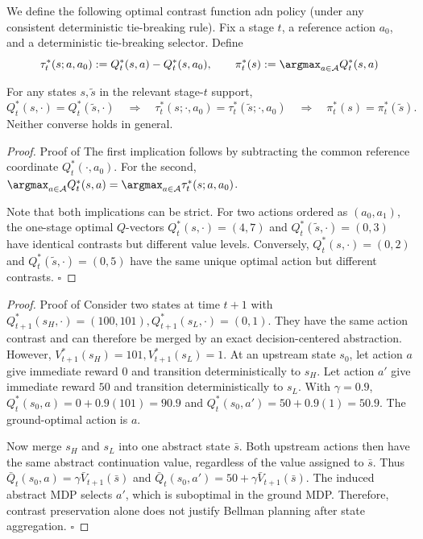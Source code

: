 \documentclass[opre,nonblindrev]{informs4}
\let\arxivSavedArgmax\argmax
\let\argmax\undefined
\let\argmax\arxivSavedArgmax
\newcommand{\blipadv}{\tau}
\renewcommand{\qed}{\unskip\nobreak\hfill\ensuremath{\square}}
\begin{document}
We define the following optimal contrast function adn policy (under any consistent deterministic tie-breaking rule). Fix a stage \(t\), a reference action \(a_0\), and a deterministic
tie-breaking selector.
Define
\[
\blipadv_t^*(s;a,a_0)
:=Q_t^*(s,a)-Q_t^*(s,a_0),
\qquad
\pi_t^*(s)
:=\argmax_{a\in\mathcal A}Q_t^*(s,a)
\]

\begin{proposition}
\label{prop:contrast-abstraction-hierarchy}
For any states \(s,\tilde s\) in the relevant stage-\(t\) support,
\[
Q_t^*(s,\cdot)=Q_t^*(\tilde s,\cdot)
\quad\Longrightarrow\quad
\blipadv_t^*(s;\cdot,a_0)
=
\blipadv_t^*(\tilde s;\cdot,a_0)
\quad\Longrightarrow\quad
\pi_t^*(s)=\pi_t^*(\tilde s).
\]
Neither converse holds in general. 
\end{proposition}

\begin{proof}{Proof of }
The first implication follows by subtracting the common reference
coordinate \(Q_t^*(\cdot,a_0)\).  For the second,
\(
\argmax_{a\in\mathcal A}Q_t^*(s,a)
=
\argmax_{a\in\mathcal A}\blipadv_t^*(s;a,a_0)\).

 Note that both implications can be strict.  For two
actions ordered as \((a_0,a_1)\), the one-stage optimal \(Q\)-vectors
\(Q_t^*(s,\cdot)=(4,7)\) and
\(Q_t^*(\tilde s,\cdot)=(0,3)\)
have identical contrasts but different value levels.  Conversely,
\(Q_t^*(s,\cdot)=(0,2)\) and
\(Q_t^*(\tilde s,\cdot)=(0,5)\)
have the same unique optimal action but different contrasts. \qed
\end{proof}


\begin{proof}{Proof of }
Consider two states at time \(t+1\) with $Q_{t+1}^*(s_H,\cdot)=(100,101),
Q_{t+1}^*(s_L,\cdot)=(0,1)$.
They have the same action contrast and can therefore be merged by an exact
decision-centered abstraction. However, $V_{t+1}^*(s_H)=101, 
V_{t+1}^*(s_L)=1$.
At an upstream state \(s_0\), let action \(a\) give immediate reward \(0\)
and transition deterministically to \(s_H\). Let action \(a'\) give immediate
reward \(50\) and transition deterministically to \(s_L\). With
\(\gamma=0.9\), \(Q_t^*(s_0,a)=0+0.9(101)=90.9\) and
\(Q_t^*(s_0,a')=50+0.9(1)=50.9\).
The ground-optimal action is \(a\).

Now merge \(s_H\) and \(s_L\) into one abstract state \(\bar s\). Both
upstream actions then have the same abstract continuation value, regardless
of the value assigned to \(\bar s\). Thus
\(\bar Q_t(s_0,a)=\gamma\bar V_{t+1}(\bar s)\) and
\(\bar Q_t(s_0,a')=50+\gamma\bar V_{t+1}(\bar s)\).
The induced abstract MDP selects \(a'\), which is suboptimal in the ground
MDP. Therefore, contrast preservation alone does not justify Bellman
planning after state aggregation. \qed
\end{proof}
\end{document}
